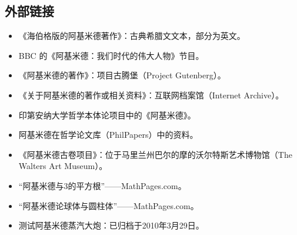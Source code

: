\subsection{外部链接}
\begin{itemize}
\item 《海伯格版的阿基米德著作》：古典希腊文文本，部分为英文。
\item BBC 的《阿基米德：我们时代的伟大人物》节目。
\item 《阿基米德的著作》：项目古腾堡（Project Gutenberg）。
\item 《关于阿基米德的著作或相关资料》：互联网档案馆（Internet Archive）。
\item 印第安纳大学哲学本体论项目中的《阿基米德》。
\item 阿基米德在哲学论文库（PhilPapers）中的资料。
\item 《阿基米德古卷项目》：位于马里兰州巴尔的摩的沃尔特斯艺术博物馆（The Walters Art Museum）。
\item “阿基米德与3的平方根”——MathPages.com。
\item “阿基米德论球体与圆柱体”——MathPages.com。
\item 测试阿基米德蒸汽大炮：已归档于2010年3月29日。
\end{itemize}